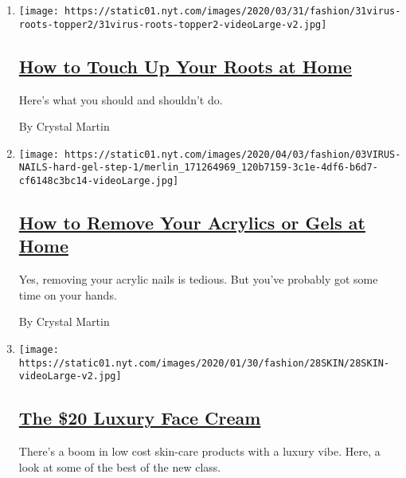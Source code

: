 \begin{enumerate}
\def\labelenumi{\arabic{enumi}.}
\item
  \texttt{[image: https://static01.nyt.com/images/2020/03/31/fashion/31virus-roots-topper2/31virus-roots-topper2-videoLarge-v2.jpg]}

  \hypertarget{how-to-touch-up-your-roots-at-home}{%
  \subsection{\texorpdfstring{\href{/2020/03/31/style/how-to-touch-up-your-roots-at-home.html}{How
  to Touch Up Your Roots at
  Home}}{How to Touch Up Your Roots at Home}}\label{how-to-touch-up-your-roots-at-home}}

  Here's what you should and shouldn't do.

  By Crystal Martin
\item
  \texttt{[image: https://static01.nyt.com/images/2020/04/03/fashion/03VIRUS-NAILS-hard-gel-step-1/merlin\_171264969\_120b7159-3c1e-4df6-b6d7-cf6148c3bc14-videoLarge.jpg]}

  \hypertarget{how-to-remove-your-acrylics-or-gels-at-home}{%
  \subsection{\texorpdfstring{\href{/2020/04/03/style/how-to-remove-your-acrylics-or-gels-at-home.html}{How
  to Remove Your Acrylics or Gels at
  Home}}{How to Remove Your Acrylics or Gels at Home}}\label{how-to-remove-your-acrylics-or-gels-at-home}}

  Yes, removing your acrylic nails is tedious. But you've probably got
  some time on your hands.

  By Crystal Martin
\item
  \texttt{[image: https://static01.nyt.com/images/2020/01/30/fashion/28SKIN/28SKIN-videoLarge-v2.jpg]}

  \hypertarget{the-20-luxury-face-cream}{%
  \subsection{\texorpdfstring{\href{/2020/01/29/style/skin-care-beauty-the-20-luxury-face-cream.html}{The
  \$20 Luxury Face
  Cream}}{The \$20 Luxury Face Cream}}\label{the-20-luxury-face-cream}}

  There's a boom in low cost skin-care products with a luxury vibe.
  Here, a look at some of the best of the new class.


\end{enumerate}
